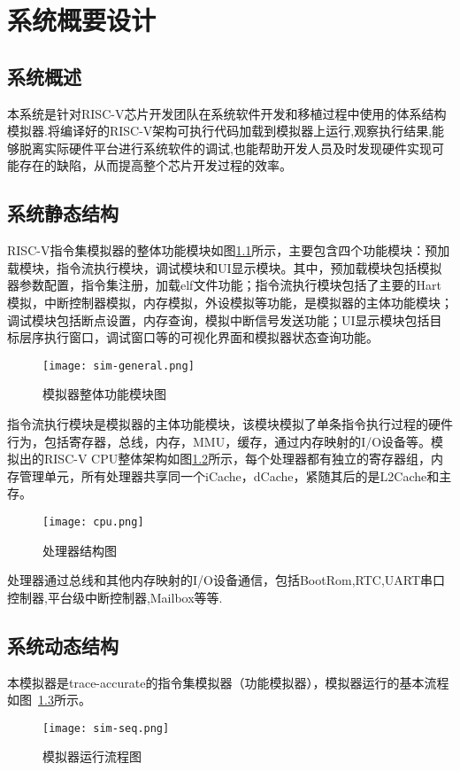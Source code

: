
\chapter{系统概要设计}

\section{系统概述}
本系统是针对RISC-V芯片开发团队在系统软件开发和移植过程中使用的体系结构模拟器.将编译好的RISC-V架构可执行代码加载到模拟器上运行,观察执行结果,能够脱离实际硬件平台进行系统软件的调试,也能帮助开发人员及时发现硬件实现可能存在的缺陷，从而提高整个芯片开发过程的效率。

\section{系统静态结构}
RISC-V指令集模拟器的整体功能模块如图\ref{fig:sim_general}所示，主要包含四个功能模块：预加载模块，指令流执行模块，调试模块和UI显示模块。其中，预加载模块包括模拟器参数配置，指令集注册，加载elf文件功能；指令流执行模块包括了主要的Hart模拟，中断控制器模拟，内存模拟，外设模拟等功能，是模拟器的主体功能模块；调试模块包括断点设置，内存查询，模拟中断信号发送功能；UI显示模块包括目标层序执行窗口，调试窗口等的可视化界面和模拟器状态查询功能。
\begin{figure}[H]
  \centering
  \texttt{[image: sim-general.png]}
  \caption{模拟器整体功能模块图}
  \label{fig:sim_general}
\end{figure}


指令流执行模块是模拟器的主体功能模块，该模块模拟了单条指令执行过程的硬件行为，包括寄存器，总线，内存，MMU，缓存，通过内存映射的I/O设备等。模拟出的RISC-V CPU整体架构如图\ref{fig:cpu}所示，每个处理器都有独立的寄存器组，内存管理单元，所有处理器共享同一个iCache，dCache，紧随其后的是L2Cache和主存。
\begin{figure}[H]
  \centering
  \texttt{[image: cpu.png]}
  \caption{处理器结构图}
  \label{fig:cpu}
\end{figure}


处理器通过总线和其他内存映射的I/O设备通信，包括BootRom,RTC,UART串口控制器,平台级中断控制器,Mailbox等等.

\section{系统动态结构}
本模拟器是trace-accurate的指令集模拟器（功能模拟器），模拟器运行的基本流程如图~\ref{fig:sim-seq}所示。
\begin{figure}[H]
  \centering
  \texttt{[image: sim-seq.png]}
  \caption{模拟器运行流程图}
  \label{fig:sim-seq}
\end{figure}


